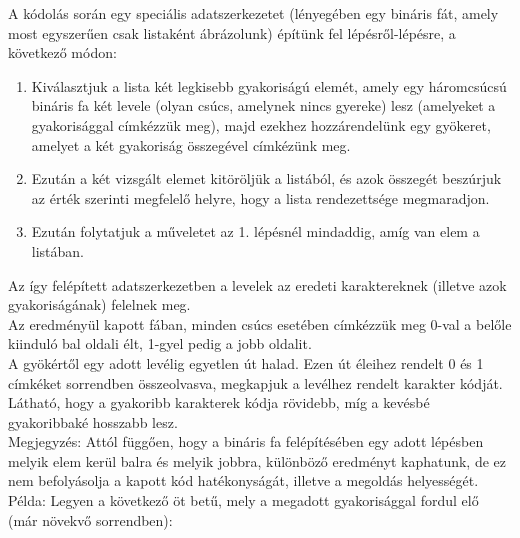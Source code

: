 \documentclass[margin=0px]{article}
\begin{document}
    \noindent A kódolás során egy speciális adatszerkezetet (lényegében egy bináris fát, amely most egyszerűen csak listaként ábrázolunk) építünk fel lépésről-lépésre, a következő módon:

    \begin{enumerate}
        \item Kiválasztjuk a lista két legkisebb gyakoriságú elemét, amely egy háromcsúcsú bináris fa két levele (olyan csúcs, amelynek nincs gyereke) lesz (amelyeket a gyakorisággal címkézzük meg), majd ezekhez hozzárendelünk egy gyökeret, amelyet a két gyakoriság összegével címkézünk meg.

        \item Ezután a két vizsgált elemet kitöröljük a listából, és azok összegét beszúrjuk az érték szerinti megfelelő helyre, hogy a lista rendezettsége megmaradjon.

        \item Ezután folytatjuk a műveletet az 1. lépésnél mindaddig, amíg van elem a listában.
    \end{enumerate}

    \noindent Az így felépített adatszerkezetben a levelek az eredeti karaktereknek (illetve azok gyakoriságának) felelnek meg.\\

    \noindent Az eredményül kapott fában, minden csúcs esetében címkézzük meg 0-val a belőle kiinduló bal oldali élt, 1-gyel pedig a jobb oldalit.\\

    \noindent A gyökértől egy adott levélig egyetlen út halad. Ezen út éleihez rendelt 0 és 1 címkéket sorrendben összeolvasva, megkapjuk a levélhez rendelt karakter kódját. Látható, hogy a gyakoribb karakterek kódja rövidebb, míg a kevésbé gyakoribbaké hosszabb lesz.\\

    \noindent Megjegyzés: Attól függően, hogy a bináris fa felépítésében egy adott lépésben melyik elem kerül balra és melyik jobbra, különböző eredményt kaphatunk, de ez nem befolyásolja a kapott kód hatékonyságát, illetve a megoldás helyességét.\\
			
	\noindent Példa: Legyen a következő öt betű, mely a megadott gyakorisággal fordul elő (már növekvő sorrendben):\\\\
    \\
			
\end{document}
